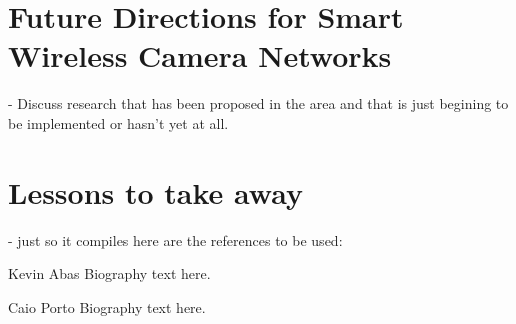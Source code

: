 \documentclass[journal,transmag]{IEEEtran}
\begin{document}
\section{Future Directions for Smart Wireless Camera Networks}
\-- Discuss research that has been proposed in the area and that is just begining to be implemented or hasn't yet at all.\\

\section{Lessons to take away}

\-- just so it compiles here are the references to be used:
~\cite{DSPcam}
~\cite{HuSIMS}
~\cite{Citric}
~\cite{OmniEye}
~\cite{ScoutNode}
~\cite{SensEye}
~\cite{WiFLIP}






{}




\begin{IEEEbiographynophoto}{Kevin Abas}
Biography text here.
\end{IEEEbiographynophoto}

\begin{IEEEbiographynophoto}{Caio Porto}
Biography text here.
\end{IEEEbiographynophoto}
\end{document}
